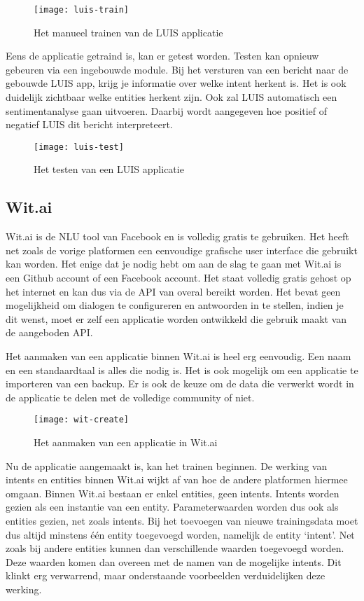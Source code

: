 \begin{figure}[H]
    \label{fig:luis-train}
    \centering
    \texttt{[image: luis-train]}
    \caption{Het manueel trainen van de LUIS applicatie}
\end{figure}

Eens de applicatie getraind is, kan er getest worden. Testen kan opnieuw gebeuren via een ingebouwde module. Bij het versturen van een bericht naar de gebouwde LUIS app, krijg je informatie over welke intent herkent is.
Het is ook duidelijk zichtbaar welke entities herkent zijn. Ook zal LUIS automatisch een sentimentanalyse gaan uitvoeren. Daarbij wordt aangegeven hoe positief of negatief LUIS dit bericht interpreteert.

\begin{figure}[H]
    \label{fig:luis-test}
    \centering
    \texttt{[image: luis-test]}
    \caption{Het testen van een LUIS applicatie}
\end{figure}

\subsection{Wit.ai}
\label{subsec:werking-platformen-wit}

Wit.ai is de NLU tool van Facebook en is volledig gratis te gebruiken. Het heeft net zoals de vorige platformen een eenvoudige grafische user interface die gebruikt kan worden. Het enige dat je nodig hebt om aan de slag te gaan met Wit.ai is een Github account of een Facebook account. Het staat volledig gratis gehost op het internet en kan dus via de API van overal bereikt worden. Het bevat geen mogelijkheid om dialogen te configureren en antwoorden in te stellen, indien je dit wenst, moet er zelf een applicatie worden ontwikkeld die gebruik maakt van de aangeboden API.

Het aanmaken van een applicatie binnen Wit.ai is heel erg eenvoudig. Een naam en een standaardtaal is alles die nodig is. Het is ook mogelijk om een applicatie te importeren van een backup. Er is ook de keuze om de data die verwerkt wordt in de applicatie te delen met de volledige community of niet.

\begin{figure}[H]
    \label{fig:wit-create}
    \centering
    \texttt{[image: wit-create]}
    \caption{Het aanmaken van een applicatie in Wit.ai}
\end{figure}

Nu de applicatie aangemaakt is, kan het trainen beginnen. De werking van intents en entities binnen Wit.ai wijkt af van hoe de andere platformen hiermee omgaan. Binnen Wit.ai bestaan er enkel entities, geen intents. Intents worden gezien als een instantie van een entity. Parameterwaarden worden dus ook als entities gezien, net zoals intents. Bij het toevoegen van nieuwe trainingsdata moet dus altijd minstens één entity toegevoegd worden, namelijk de entity ‘intent’. Net zoals bij andere entities kunnen dan verschillende waarden toegevoegd worden. Deze waarden komen dan overeen met de namen van de mogelijke intents. Dit klinkt erg verwarrend, maar onderstaande voorbeelden verduidelijken deze werking.

